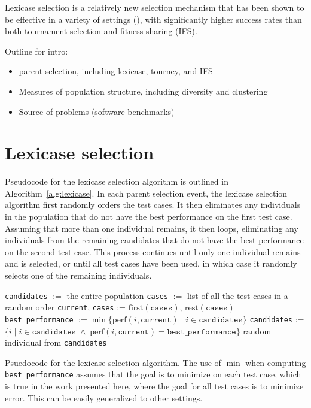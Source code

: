 Lexicase selection is a relatively new selection mechanism that has been shown to be effective in a variety of
settings (\cite{Helmuth:2015:ieeeTEC,Helmuth:2015:GECCO}), with significantly higher success rates
than both tournament selection and fitness sharing (IFS).

Outline for intro:

\begin{itemize}
\item parent selection, including lexicase, tourney, and IFS

\item Measures of population structure, including diversity and clustering

\item Source of problems (software benchmarks)

\end{itemize}


\section{Lexicase selection}

	
Pseudocode for the lexicase selection algorithm is outlined in 
Algorithm~\ref{alg:lexicase}. In each parent selection event, the lexicase selection algorithm 
first randomly orders the test cases. It then eliminates any individuals in the population 
that do not have the best performance on the first test case. 
Assuming that more than one individual remains, it then loops, eliminating any individuals from 
the remaining candidates that do not have the best performance on the second test case. This 
process continues until only one individual remains and is selected, or until all test cases 
have been used, in which case it randomly selects one of the remaining individuals.

\begin{algorithm}[tb]
	\begin{algorithmic}
		\STATE \texttt{candidates} $:=$ the entire population
		\STATE \texttt{cases} $:=$ list of all the test cases in a random order
			\STATE \texttt{current}, \texttt{cases} := $\textrm{first}(\texttt{cases})$, $\textrm{rest}(\texttt{cases})$
			\STATE \texttt{best\_performance} $:= \min \{ \textrm{perf}(i, \texttt{current}) \;|\; i \in \texttt{candidates} \}$
			\STATE \texttt{candidates} := $\{ i \;|\; i \in \texttt{candidates} \;\land\; \textrm{perf}(i, \texttt{current}) = \texttt{best\_performance}\}$
		\ENDWHILE
		\RETURN random individual from \texttt{candidates}
	\end{algorithmic}
	\caption{Psuedocode for the lexicase selection algorithm. The use of $\min$ when computing 
		\texttt{best\_performance} assumes that the goal is to minimize on each test case, which
		is true in the work presented here, where the goal for all test cases is to minimize error.
		This can be easily generalized to other settings.}
	\label{alg:lexicase}
\end{algorithm}

